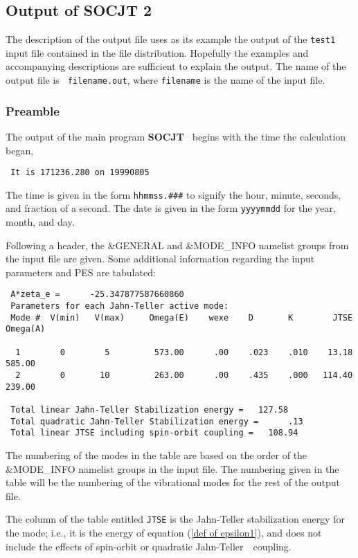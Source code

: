\documentclass{article}
\newcommand{\JT}{Jahn-Teller\ }
\newcommand{\socjttwo}{\bf{SOCJT 2 }}
\newcommand{\socjt}{{\bf SOCJT }}
\begin{document}
\subsection{Output of \socjttwo }

The description of the output file uses as its example the output of
the {\tt test1} input file contained in the file
distribution. Hopefully the examples and accompanying descriptions are
sufficient to explain the output. The name of the output file is {\tt
  filename.out}, where {\tt filename} is the name of the input file.

\subsubsection{Preamble}

The output of the main program \socjt\ begins with the time the
calculation began,
\begin{verbatim}
 It is 171236.280 on 19990805
\end{verbatim}
The time is given in the form {\tt hhmmss.\#\#\#} to signify the
hour, minute, seconds, and fraction of a second. The date is given in
the form {\tt yyyymmdd} for the year, month, and day.

Following a header, the \&GENERAL and \&MODE\_INFO namelist groups
from the input file are given. Some additional information regarding
the input parameters and PES are tabulated:
\begin{verbatim}
 A*zeta_e =      -25.347877587660860
 Parameters for each Jahn-Teller active mode:
 Mode #  V(min)   V(max)     Omega(E)    wexe    D       K        JTSE  Omega(A)
 
  1        0        5         573.00      .00    .023    .010    13.18    585.00
  2        0       10         263.00      .00    .435    .000   114.40    239.00
 
 Total linear Jahn-Teller Stabilization energy =   127.58
 Total quadratic Jahn-Teller Stabilization energy =      .13
 Total linear JTSE including spin-orbit coupling =   108.94
\end{verbatim}
The numbering of the modes in the table are based on the order of the
\&MODE\_INFO namelist groups in the input file. The numbering given in
the table will be the numbering of the vibrational modes for the rest
of the output file.

The column of the table entitled {\tt JTSE} is the Jahn-Teller
stabilization energy for the mode; i.e., it is the energy of equation
(\ref{def of epsilon1}), and does not include the effects of
spin-orbit or quadratic \JT\ coupling.
\end{document}
